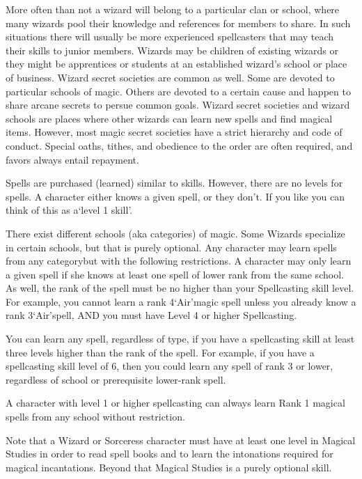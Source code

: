 \documentclass[twoside]{book}
\begin{document}
    {  
    More often than not a wizard will belong to a particular clan or school, where many wizards pool their knowledge and references for members to share. In such situations there will usually be more experienced spellcasters that may teach their skills to junior members. Wizards may be children of existing wizards or they might be apprentices or students at an established wizard's school or place of business. Wizard secret societies are common as well. Some are devoted to particular schools of magic. Others are devoted to a certain cause and happen to share arcane secrets to persue common goals. Wizard secret societies and wizard schools are places where other wizards can learn new spells and find magical items. However, most magic secret societies have a strict hierarchy and code of conduct. Special oaths, tithes, and obedience to the order are often required, and favors always entail repayment.
    }
  
    {  
    Spells are purchased (learned) similar to skills. However, there are no levels for spells. A character either knows a given spell, or they don't. If you like you can think of this as a`level 1 skill'.
    }
  
    {  
    There exist different schools (aka categories) of magic. Some Wizards specialize in certain schools, but that is purely optional. Any character may learn spells from any categorybut with the following restrictions. A character may only learn a given spell if she knows at least one spell of lower rank from the same school. As well, the rank of the spell must be no higher than your Spellcasting skill level. For example, you cannot learn a rank 4`Air'magic spell unless you already know a rank 3`Air'spell, AND you must have Level 4 or higher Spellcasting.
    }
  
    {  
    You can learn any spell, regardless of type, if you have a spellcasting skill at least three levels higher than the rank of the spell. For example, if you have a spellcasting skill level of 6, then you could learn any spell of rank 3 or lower, regardless of school or prerequisite lower-rank spell.
    }
  
    {  
    A character with level 1 or higher spellcasting can always learn Rank 1 magical spells from any school without restriction.
    }
  
    {  
    Note that a Wizard or Sorceress character must have at least one level in Magical Studies in order to read spell books and to learn the intonations required for magical incantations. Beyond that Magical Studies is a purely optional skill.
    }
  
\end{document}
